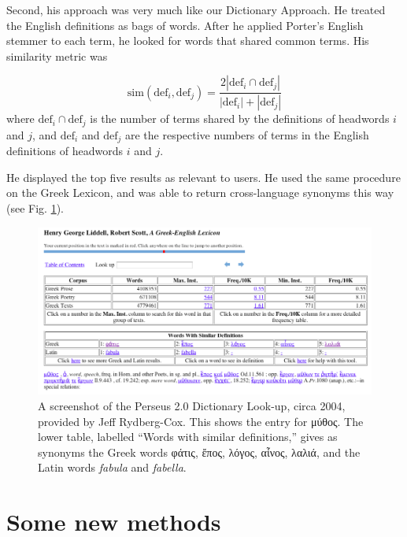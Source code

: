 \documentclass[]{article}
\begin{document}
		Second, his approach was very much like our Dictionary Approach.  He treated the English definitions as bags of words.  After he applied Porter's English stemmer to each term, he looked for words that shared common terms.  His similarity metric was

		\begin{equation}
			\mbox{sim}(\mbox{def}_{i},\mbox{def}_{j}) = \frac{2|\mbox{def}_{i} \cap \mbox{def}_{j}|}{|\mbox{def}_{i}| + |\mbox{def}_{j}|}
		\end{equation}
	where $\mbox{def}_{i} \cap \mbox{def}_{j}$ is the number of terms shared by the definitions of headwords $i$ and $j$, and $\mbox{def}_{i}$ and $\mbox{def}_{j}$ are the respective numbers of terms in the English definitions of headwords $i$ and $j$.

		He displayed the top five results as relevant to users.  He used the same procedure on the Greek Lexicon, and was able to return cross-language synonyms this way (see Fig. \ref{perseussyns}).

		\begin{figure}
			\includegraphics[width=\textwidth]{figure1.png}
			
			
			\caption{A screenshot of the Perseus 2.0 Dictionary Look-up, circa 2004, provided by Jeff Rydberg-Cox.  This shows the entry for μύθος.  The lower table, labelled “Words with similar definitions,” gives as synonyms the Greek words φάτις, ἔπος, λόγος, αἶνος, λαλιά, and the Latin words \textit{fabula} and \textit{fabella}.\label{perseussyns}}
		\end{figure}
		
	\section{Some new methods}
		
\end{document}
